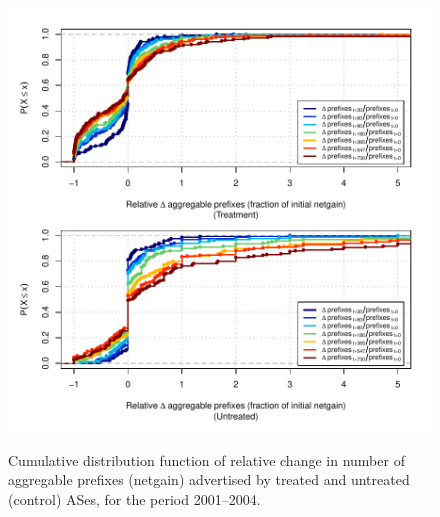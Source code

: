 \begin{figure}[H]
\begin{centering}
\begin{singlespace}
    \includegraphics[width=6in]{figures/behavior-rel_netgain-2001_2004-corr.pdf}
    \vspace{-2em}\\
    \caption{Cumulative distribution function of relative change in number of
    aggregable prefixes (netgain) advertised by treated and untreated (control)
    ASes, for the period 2001--2004.}
\end{singlespace}
\end{centering}
\end{figure}
